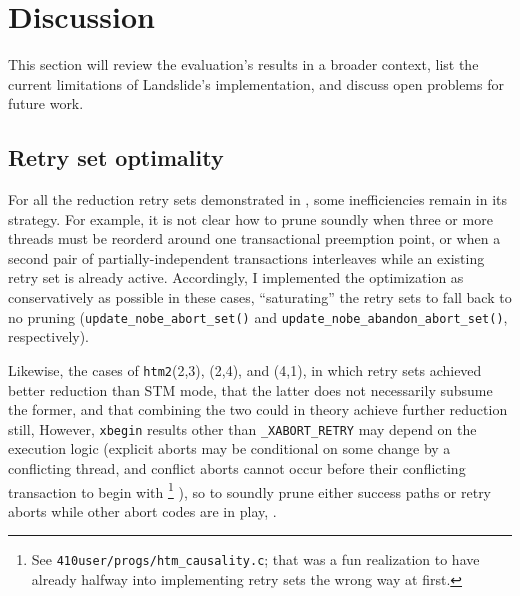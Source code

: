 


\section{Discussion}
\label{sec:tm-discussion}

This section will review %
the evaluation's results in a broader context,
list the current limitations of Landslide's implementation,
and discuss open problems for future work.

\subsection{Retry set optimality}

For all the reduction retry sets demonstrated in ,
some inefficiencies remain in its strategy.
For example, it is not clear how to prune soundly
when three or more threads must be reorderd around one transactional preemption point,
or when a second pair of partially-independent transactions interleaves while an existing retry set is already active.
Accordingly, I implemented the optimization as conservatively as possible in these cases,
``saturating'' the retry sets to fall back to no pruning
({\tt update\_nobe\_abort\_set()} and
{\tt update\_nobe\_abandon\_abort\_set()}, respectively).

Likewise, the cases of {\tt htm2}(2,3), (2,4), and (4,1),
in which retry sets achieved better reduction than STM mode,
 that the latter does not necessarily subsume the former,
and that combining the two could in theory achieve further reduction still,
However, {\tt xbegin} results other than {\tt \_XABORT\_RETRY}
may depend on the execution logic
(explicit aborts may be conditional on some change by a conflicting thread,
and conflict aborts cannot occur before their conflicting transaction to begin with%
\footnote{See {\tt 410user/progs/htm\_causality.c}; that was a fun realization to have
already halfway into implementing retry sets the wrong way at first.}%
),
so 
to soundly prune either success paths or retry aborts
while other abort codes are in play,
.


